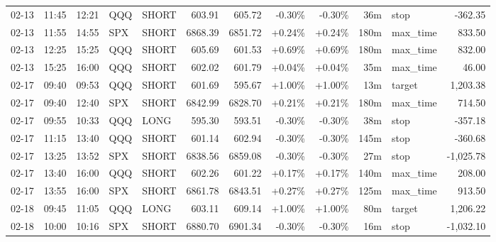\documentclass[11pt,a4paper,twoside]{article}
\begin{document}
\begin{center}
\begin{longtable}{>{\color{txtmain}}l l l l l r r r r r >{\color{txtmain}}l r}
02-13 & 11:45 & 12:21 & QQQ & SHORT & 603.91 & 605.72 & \textcolor{lossred}{-0.30\%} & \textcolor{lossred}{-0.30\%} & 36m & stop & \textcolor{lossred}{-362.35} \\
02-13 & 11:55 & 14:55 & SPX & SHORT & 6868.39 & 6851.72 & \textcolor{wingreen}{+0.24\%} & \textcolor{wingreen}{+0.24\%} & 180m & max\_time & \textcolor{wingreen}{833.50} \\
02-13 & 12:25 & 15:25 & QQQ & SHORT & 605.69 & 601.53 & \textcolor{wingreen}{+0.69\%} & \textcolor{wingreen}{+0.69\%} & 180m & max\_time & \textcolor{wingreen}{832.00} \\
02-13 & 15:25 & 16:00 & QQQ & SHORT & 602.02 & 601.79 & \textcolor{wingreen}{+0.04\%} & \textcolor{wingreen}{+0.04\%} & 35m & max\_time & \textcolor{wingreen}{46.00} \\
02-17 & 09:40 & 09:53 & QQQ & SHORT & 601.69 & 595.67 & \textcolor{wingreen}{+1.00\%} & \textcolor{wingreen}{+1.00\%} & 13m & target & \textcolor{wingreen}{1,203.38} \\
02-17 & 09:40 & 12:40 & SPX & SHORT & 6842.99 & 6828.70 & \textcolor{wingreen}{+0.21\%} & \textcolor{wingreen}{+0.21\%} & 180m & max\_time & \textcolor{wingreen}{714.50} \\
02-17 & 09:55 & 10:33 & QQQ & LONG & 595.30 & 593.51 & \textcolor{lossred}{-0.30\%} & \textcolor{lossred}{-0.30\%} & 38m & stop & \textcolor{lossred}{-357.18} \\
02-17 & 11:15 & 13:40 & QQQ & SHORT & 601.14 & 602.94 & \textcolor{lossred}{-0.30\%} & \textcolor{lossred}{-0.30\%} & 145m & stop & \textcolor{lossred}{-360.68} \\
02-17 & 13:25 & 13:52 & SPX & SHORT & 6838.56 & 6859.08 & \textcolor{lossred}{-0.30\%} & \textcolor{lossred}{-0.30\%} & 27m & stop & \textcolor{lossred}{-1,025.78} \\
02-17 & 13:40 & 16:00 & QQQ & SHORT & 602.26 & 601.22 & \textcolor{wingreen}{+0.17\%} & \textcolor{wingreen}{+0.17\%} & 140m & max\_time & \textcolor{wingreen}{208.00} \\
02-17 & 13:55 & 16:00 & SPX & SHORT & 6861.78 & 6843.51 & \textcolor{wingreen}{+0.27\%} & \textcolor{wingreen}{+0.27\%} & 125m & max\_time & \textcolor{wingreen}{913.50} \\
02-18 & 09:45 & 11:05 & QQQ & LONG & 603.11 & 609.14 & \textcolor{wingreen}{+1.00\%} & \textcolor{wingreen}{+1.00\%} & 80m & target & \textcolor{wingreen}{1,206.22} \\
02-18 & 10:00 & 10:16 & SPX & SHORT & 6880.70 & 6901.34 & \textcolor{lossred}{-0.30\%} & \textcolor{lossred}{-0.30\%} & 16m & stop & \textcolor{lossred}{-1,032.10} \\

\end{longtable}
\end{center}
\end{document}
